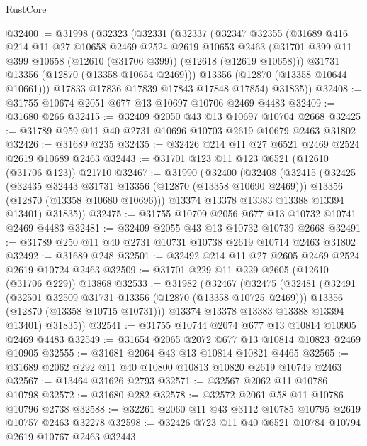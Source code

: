 \begin{lexlean}{RustCore}
\begin{coremodule}
@32400 := @31998
    (@32323
      (@32331
        (@32337
          (@32347
            @32355
            (@31689
              @416
              @214
              @11
              @27
              @10658
              @2469
              @2524
              @2619
              @10653
              @2463
              (@31701 @399 @11 @399 @10658 (@12610 (@31706 @399)) (@12618 (@12619 @10658)))
              @31731
              @13356
              (@12870 (@13358 @10654 @2469)))
            @13356
            (@12870 (@13358 @10644 @10661)))
          @17833
          @17836
          @17839
          @17843
          @17848
          @17854)
        @31835))
@32408 := @31755 @10674 @2051 @677 @13 @10697 @10706 @2469 @4483
@32409 := @31680 @266
@32415 := @32409 @2050 @43 @13 @10697 @10704 @2668
@32425 := @31789 @959 @11 @40 @2731 @10696 @10703 @2619 @10679 @2463 @31802
@32426 := @31689 @235
@32435 := @32426 @214 @11 @27 @6521 @2469 @2524 @2619 @10689 @2463
@32443 := @31701 @123 @11 @123 @6521 (@12610 (@31706 @123)) @21710
@32467 := @31990
    (@32400
      (@32408
        (@32415
          (@32425
            (@32435 @32443 @31731 @13356 (@12870 (@13358 @10690 @2469)))
            @13356
            (@12870 (@13358 @10680 @10696)))
          @13374
          @13378
          @13383
          @13388
          @13394
          @13401)
        @31835))
@32475 := @31755 @10709 @2056 @677 @13 @10732 @10741 @2469 @4483
@32481 := @32409 @2055 @43 @13 @10732 @10739 @2668
@32491 := @31789 @250 @11 @40 @2731 @10731 @10738 @2619 @10714 @2463 @31802
@32492 := @31689 @248
@32501 := @32492 @214 @11 @27 @2605 @2469 @2524 @2619 @10724 @2463
@32509 := @31701 @229 @11 @229 @2605 (@12610 (@31706 @229)) @13868
@32533 := @31982
    (@32467
      (@32475
        (@32481
          (@32491
            (@32501 @32509 @31731 @13356 (@12870 (@13358 @10725 @2469)))
            @13356
            (@12870 (@13358 @10715 @10731)))
          @13374
          @13378
          @13383
          @13388
          @13394
          @13401)
        @31835))
@32541 := @31755 @10744 @2074 @677 @13 @10814 @10905 @2469 @4483
@32549 := @31654 @2065 @2072 @677 @13 @10814 @10823 @2469 @10905
@32555 := @31681 @2064 @43 @13 @10814 @10821 @4465
@32565 := @31689 @2062 @292 @11 @40 @10800 @10813 @10820 @2619 @10749 @2463
@32567 := @13464 @31626 @2793
@32571 := @32567 @2062 @11 @10786 @10798
@32572 := @31680 @282
@32578 := @32572 @2061 @58 @11 @10786 @10796 @2738
@32588 := @32261 @2060 @11 @43 @3112 @10785 @10795 @2619 @10757 @2463 @32278
@32598 := @32426 @723 @11 @40 @6521 @10784 @10794 @2619 @10767 @2463 @32443

\end{coremodule}
\end{lexlean}
